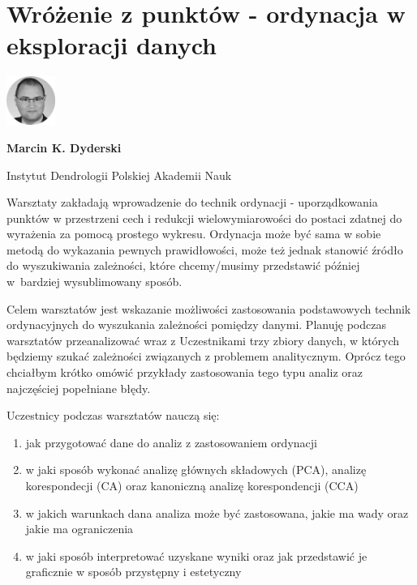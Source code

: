 \documentclass[\main/boa.tex]{subfiles}
\begin{document}
\section{Wróżenie z punktów - ordynacja w eksploracji danych}
\begin{minipage}[t]{0.915\textwidth}
	\center     
    \includegraphics[width=60px]{img/workshops/czarno_biale/mdyderski_crop.png} 
\end{minipage}

\begin{minipage}{0.915\textwidth}
\centering
{\bf {} Marcin K. Dyderski}
\end{minipage}

\vskip 0.3cm

\begin{affiliations}
\begin{minipage}{0.915\textwidth}
\centering
\large Instytut Dendrologii Polskiej Akademii Nauk  \\[2pt]
\end{minipage}
\end{affiliations}

\vskip 0.8cm

\opiswarsztatu Warsztaty zakładają wprowadzenie do technik ordynacji - uporządkowania punktów w przestrzeni cech i redukcji wielowymiarowości do postaci zdatnej do wyrażenia za pomocą prostego wykresu. Ordynacja może być sama w sobie metodą do wykazania pewnych prawidłowości, może też jednak stanowić źródło do wyszukiwania zależności, które chcemy/musimy przedstawić później w~bardziej wysublimowany sposób.

Celem warsztatów jest wskazanie możliwości zastosowania podstawowych technik ordynacyjnych do wyszukania zależności pomiędzy danymi. Planuję podczas warsztatów przeanalizować wraz z Uczestnikami trzy zbiory danych, w których będziemy szukać zależności związanych z problemem analitycznym. Oprócz tego chciałbym krótko omówić przykłady zastosowania tego typu analiz oraz najczęściej popełniane błędy.

Uczestnicy podczas warsztatów nauczą się:
\begin{enumerate}
\item jak przygotować dane do analiz z zastosowaniem ordynacji
\item w jaki sposób wykonać analizę głównych składowych (PCA), analizę korespondecji (CA) oraz kanoniczną analizę korespondencji (CCA)
\item w jakich warunkach dana analiza może być zastosowana, jakie ma wady oraz jakie ma ograniczenia
\item w jaki sposób interpretować uzyskane wyniki oraz jak przedstawić je graficznie w sposób przystępny i estetyczny
\end{enumerate}
\end{document}
